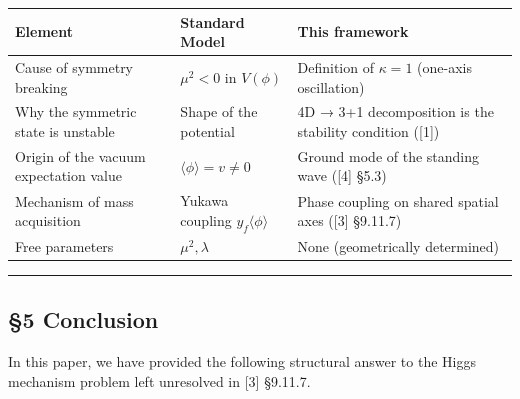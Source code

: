 \documentclass[
  a4paper,11pt]{article}
\newcounter{none} %
\begin{document}
{\def\LTcaptype{none} %
\begin{longtable}[]{@{}
  >{\raggedright\arraybackslash}p{}
  >{\raggedright\arraybackslash}p{}
  >{\raggedright\arraybackslash}p{}@{}}
\toprule\noalign{}
\begin{minipage}[b]{\linewidth}\raggedright
Element
\end{minipage} & \begin{minipage}[b]{\linewidth}\raggedright
Standard Model
\end{minipage} & \begin{minipage}[b]{\linewidth}\raggedright
This framework
\end{minipage} \\
\midrule\noalign{}
\endhead
\bottomrule\noalign{}
\endlastfoot
Cause of symmetry breaking & \(\mu^2 < 0\) in \(V(\phi)\) & Definition
of \(\kappa = 1\) (one-axis oscillation) \\
Why the symmetric state is unstable & Shape of the potential & 4D → 3+1
decomposition is the stability condition ({[}1{]}) \\
Origin of the vacuum expectation value &
\(\langle\phi\rangle = v \neq 0\) & Ground mode of the standing wave
({[}4{]} §5.3) \\
Mechanism of mass acquisition & Yukawa coupling
\(y_f \langle\phi\rangle\) & Phase coupling on shared spatial axes
({[}3{]} §9.11.7) \\
Free parameters & \(\mu^2, \lambda\) & None (geometrically
determined) \\
\end{longtable}
}

\begin{center}\rule{0.5\linewidth}{0.5pt}\end{center}

\subsection{§5 Conclusion}\label{conclusion}

In this paper, we have provided the following structural answer to the
Higgs mechanism problem left unresolved in {[}3{]} §9.11.7.
\end{document}

